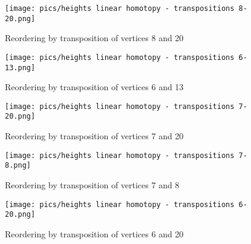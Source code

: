 \documentclass{article}
\begin{document}
\begin{figure}[htbp]
    \centering
    \texttt{[image: pics/heights linear homotopy - transpositions 8-20.png]}
    \caption{Reordering by transposition of vertices 8 and 20}
    \label{fig:transposition8and20}
\end{figure}
\begin{figure}[htbp]
    \centering
    \texttt{[image: pics/heights linear homotopy - transpositions 6-13.png]}
    \caption{Reordering by transposition of vertices 6 and 13}
    \label{fig:transposition6and13}
\end{figure}
\begin{figure}[htbp]
    \centering
    \texttt{[image: pics/heights linear homotopy - transpositions 7-20.png]}
    \caption{Reordering by transposition of vertices 7 and 20}
    \label{fig:transposition7and20}
\end{figure}
\begin{figure}[htbp]
    \centering
    \texttt{[image: pics/heights linear homotopy - transpositions 7-8.png]}
    \caption{Reordering by transposition of vertices 7 and 8}
    \label{fig:transposition7and8}
\end{figure}
\begin{figure}[htbp]
    \centering
    \texttt{[image: pics/heights linear homotopy - transpositions 6-20.png]}
    \caption{Reordering by transposition of vertices 6 and 20}
    \label{fig:transposition6and20}
\end{figure}
\end{document}
